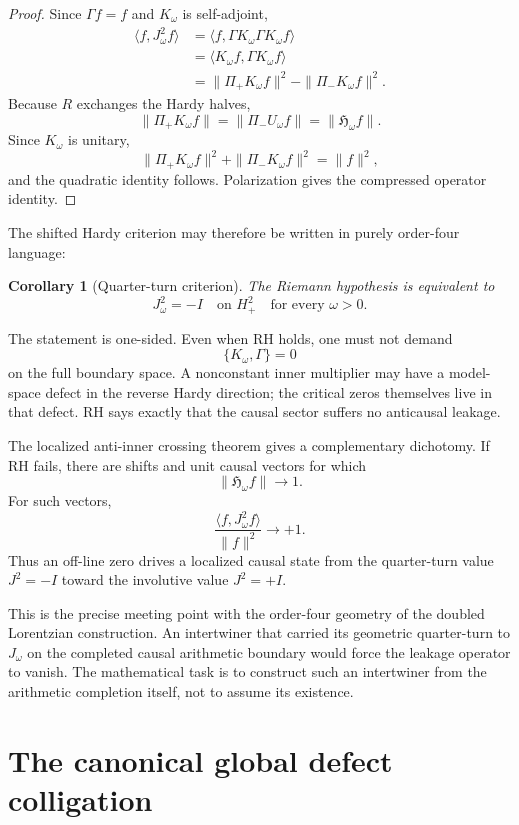 \documentclass[11pt]{article}
\newtheorem{corollary}[theorem]{Corollary}
\theoremstyle{definition}
\theoremstyle{remark}
\begin{document}
\begin{proof}
Since \(\Gamma f=f\) and \(K_\omega\) is self-adjoint,
\begin{align*}
\langle f,J_\omega^2f\rangle
&=
\langle f,\Gamma K_\omega\Gamma K_\omega f\rangle\\
&=
\langle K_\omega f,\Gamma K_\omega f\rangle\\
&=
\|\Pi_+K_\omega f\|^2
-
\|\Pi_-K_\omega f\|^2.
\end{align*}
Because \(R\) exchanges the Hardy halves,
\[
\|\Pi_+K_\omega f\|
=
\|\Pi_-U_\omega f\|
=
\|\mathfrak H_\omega f\|.
\]
Since \(K_\omega\) is unitary,
\[
\|\Pi_+K_\omega f\|^2+\|\Pi_-K_\omega f\|^2=\|f\|^2,
\]
and the quadratic identity follows.  Polarization gives the compressed operator identity.
\end{proof}

The shifted Hardy criterion may therefore be written in purely order-four language:

\begin{corollary}[Quarter-turn criterion]
The Riemann hypothesis is equivalent to
\[
\boxed{
J_\omega^2=-I
\quad\text{on }H^2_+
\quad\text{for every }\omega>0.
}
\]
\end{corollary}

The statement is one-sided.  Even when RH holds, one must not demand
\[
\{K_\omega,\Gamma\}=0
\]
on the full boundary space.  A nonconstant inner multiplier may have a model-space defect in the reverse Hardy direction; the critical zeros themselves live in that defect.  RH says exactly that the causal sector suffers no anticausal leakage.

The localized anti-inner crossing theorem gives a complementary dichotomy.  If RH fails, there are shifts and unit causal vectors for which
\[
\|\mathfrak H_\omega f\|\longrightarrow1.
\]
For such vectors,
\[
\frac{\langle f,J_\omega^2f\rangle}{\|f\|^2}
\longrightarrow+1.
\]
Thus an off-line zero drives a localized causal state from the quarter-turn value \(J^2=-I\) toward the involutive value \(J^2=+I\).

This is the precise meeting point with the order-four geometry of the doubled Lorentzian construction.  An intertwiner that carried its geometric quarter-turn to \(J_\omega\) on the completed causal arithmetic boundary would force the leakage operator to vanish.  The mathematical task is to construct such an intertwiner from the arithmetic completion itself, not to assume its existence.


\section{The canonical global defect colligation}
\end{document}
